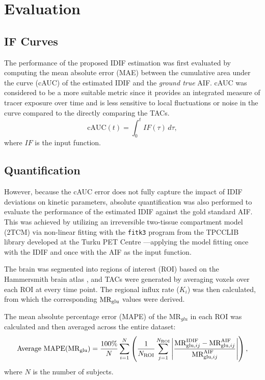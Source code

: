 \section{Evaluation}
\subsection{IF Curves}
The performance of the proposed IDIF estimation was first evaluated by computing the mean absolute error (MAE) between the cumulative area under the curve (cAUC) of the estimated IDIF and the \textit{ground true} AIF. cAUC was considered to be a more suitable metric since it provides an integrated measure of tracer exposure over time and is less sensitive to local fluctuations or noise in the curve compared to the directly comparing the TACs.
\begin{equation}
	\textrm{cAUC}(t) =  \int_{0}^{t} IF(\tau) \, d\tau,
\end{equation}
where \(IF\) is the input function.

\subsection{Quantification}
However, because the cAUC error does not fully capture the impact of IDIF deviations on kinetic parameters, absolute quantification was also performed to evaluate the performance of the estimated IDIF against the gold standard AIF.
This was achieved by utilizing an irreversible two-tissue compartment model (2TCM) via non-linear fitting with the \texttt{fitk3} program from the TPCCLIB library developed at the Turku PET Centre \cite{oikonen2018tpcclib}—applying the model fitting once with the IDIF and once with the AIF as the input function.

The brain was segmented into regions of interest (ROI) based on the Hammersmith brain atlas \cite{hammers2003three}, and TACs were generated by averaging voxels over each ROI at every time point.
The regional influx rate (\(K_i\)) was then calculated, from which the corresponding \(\text{MR}_{\text{glu}}\) values were derived.

The mean absolute percentage error (MAPE) of the \(\textrm{MR}_{glu}\) in each ROI was calculated and then averaged across the entire dataset:
\begin{equation}
	\text{Average MAPE}(\text{MR}_{\text{glu}})= \frac{100\%}{N} \sum_{i=1}^{N} \left( \frac{1}{N_{\text{ROI}}} \sum_{j=1}^{N_{\text{ROI}}} \left| \frac{\textrm{MR}_{\textrm{glu},ij}^{\textrm{IDIF}} - \textrm{MR}_{\textrm{glu},ij}^{\textrm{AIF}}}{\textrm{MR}_{\textrm{glu},ij}^{\textrm{AIF}}} \right| \right),
\end{equation}
where $N$ is the number of subjects.

